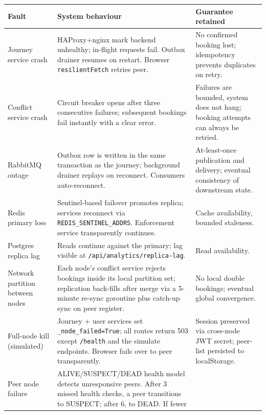 \documentclass[12pt,a4paper]{article}
\begin{document}
\begin{table}[H]
\centering\footnotesize
\begin{tabularx}{\textwidth}{L{3.4cm} X X}
  \toprule
  \textbf{Fault} & \textbf{System behaviour} & \textbf{Guarantee retained} \\
  \midrule
  Journey service crash &
    HAProxy+nginx mark backend unhealthy; in-flight requests fail. Outbox
    drainer resumes on restart. Browser \texttt{resilientFetch} retries
    peer. &
    No confirmed booking lost; idempotency prevents duplicates on retry. \\\addlinespace[0.1cm]
  Conflict service crash &
    Circuit breaker opens after three consecutive failures; subsequent
    bookings fail instantly with a clear error. &
    Failures are bounded, system does not hang; booking attempts can
    always be retried. \\\addlinespace[0.1cm]
  RabbitMQ outage &
    Outbox row is written in the same transaction as the journey;
    background drainer replays on reconnect. Consumers auto-reconnect. &
    At-least-once publication and delivery; eventual consistency of
    downstream state. \\\addlinespace[0.1cm]
  Redis primary loss &
    Sentinel-based failover promotes replica; services reconnect via
    \texttt{REDIS\_SENTINEL\_ADDRS}. Enforcement service transparently
    continues. & Cache availability, bounded staleness. \\\addlinespace[0.1cm]
  Postgres replica lag &
    Reads continue against the primary; lag visible at
    \texttt{/api/analytics/replica-lag}. & Read availability. \\\addlinespace[0.1cm]
  Network partition between nodes &
    Each node's conflict service rejects bookings inside its local
    partition set; replication back-fills after merge via a 5-minute
    re-sync goroutine plus catch-up sync on peer register. & No local
    double bookings; eventual global convergence. \\\addlinespace[0.1cm]
  Full-node kill (simulated) &
    Journey + user services set \texttt{\_node\_failed=True}; all routes
    return 503 except \texttt{/health} and the simulate endpoints.
    Browser fails over to peer transparently. & Session preserved via
    cross-node JWT secret; peer-list persisted to localStorage. \\\addlinespace[0.1cm]
  Peer node failure &
    ALIVE/SUSPECT/DEAD health model detects unresponsive peers. After 3 missed
    health checks, a peer transitions to SUSPECT; after 6, to DEAD. If fewer

\end{tabularx}
\end{table}
\end{document}
